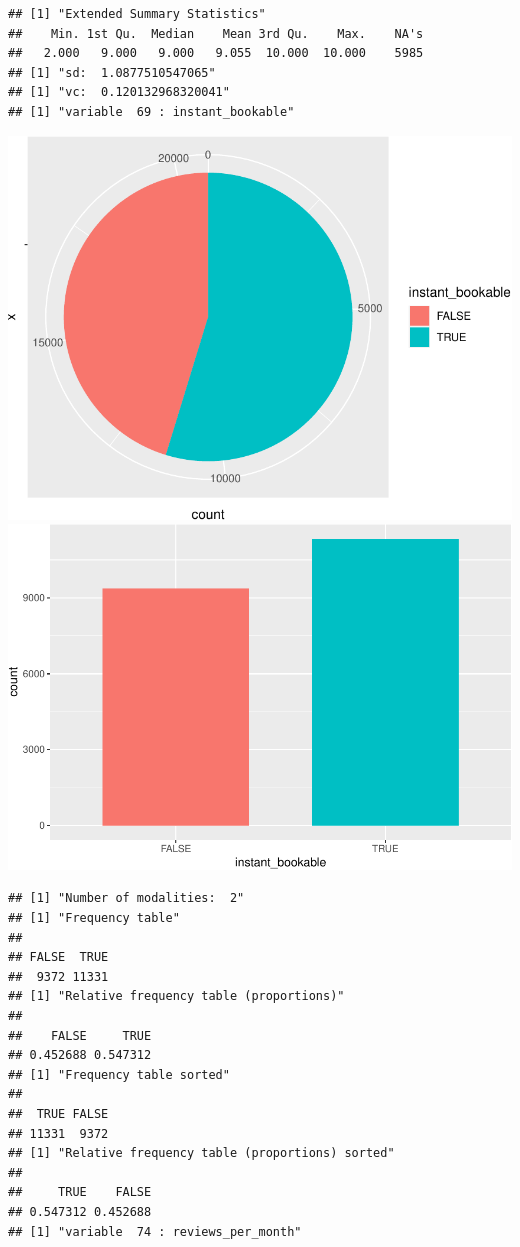 \begin{verbatim}
## [1] "Extended Summary Statistics"
##    Min. 1st Qu.  Median    Mean 3rd Qu.    Max.    NA's 
##   2.000   9.000   9.000   9.055  10.000  10.000    5985 
## [1] "sd:  1.0877510547065"
## [1] "vc:  0.120132968320041"
## [1] "variable  69 : instant_bookable"
\end{verbatim}

\includegraphics{anal_files/figure-latex/unnamed-chunk-9-52.pdf}
\includegraphics{anal_files/figure-latex/unnamed-chunk-9-53.pdf}

\begin{verbatim}
## [1] "Number of modalities:  2"
## [1] "Frequency table"
## 
## FALSE  TRUE 
##  9372 11331 
## [1] "Relative frequency table (proportions)"
## 
##    FALSE     TRUE 
## 0.452688 0.547312 
## [1] "Frequency table sorted"
## 
##  TRUE FALSE 
## 11331  9372 
## [1] "Relative frequency table (proportions) sorted"
## 
##     TRUE    FALSE 
## 0.547312 0.452688 
## [1] "variable  74 : reviews_per_month"
\end{verbatim}

